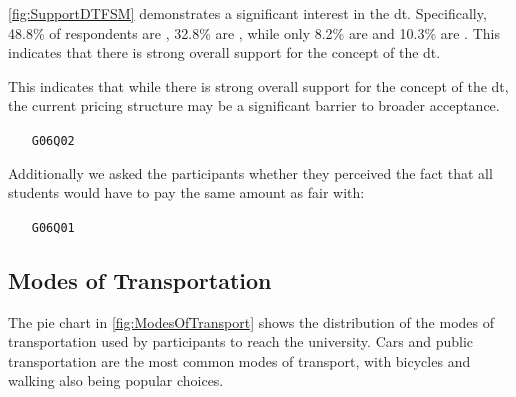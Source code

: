 \ref{fig:SupportDTFSM} demonstrates a significant interest in the \gls{dt}. Specifically, 48.8\% of respondents are , 32.8\% are , while only 8.2\% are  and 10.3\% are . This indicates that there is strong overall support for the concept of the \gls{dt}.

This indicates that while there is strong overall support for the concept of the \gls{dt}, the current pricing structure may be a significant barrier to broader acceptance.

\begin{multicols}{2}
    {
        
    } \columnbreak {
        
    }
\end{multicols}

\clearpage

\begin{enumerate}
    \item[\texttt{G06Q02}] 
\end{enumerate}

\begin{multicols}{2}
    
    \columnbreak
    
\end{multicols}

Additionally we asked the participants whether they perceived the fact that all students would have to pay the same amount as fair with:

\begin{enumerate}
    \item[\texttt{G06Q01}] 
\end{enumerate}

\begin{multicols}{2}
    
    \columnbreak
    
\end{multicols}

\pagebreak

\subsection{Modes of Transportation}
\begin{multicols}{2}
    
    \columnbreak
    The pie chart in \ref{fig:ModesOfTransport} shows the distribution of the modes of transportation used by participants to reach the university.
    Cars and public transportation are the most common modes of transport, with bicycles and walking also being popular choices.
\end{multicols}

